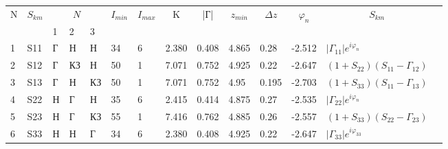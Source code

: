 
	\begin{tabular}{|l|l|l|l|l|l|l|l|l|l|l|l|l|l}
	\cline{1-13}
	\multicolumn{1}{|c|}{\multirow{2}{*}{N}} & 
	\multicolumn{1}{c|}{\multirow{2}{*}{$S_{km}$}} & 
	\multicolumn{3}{c|}{$N_{}$} &
	\multicolumn{1}{c|}{\multirow{2}{*}{$I_{min}$}} & 
	\multicolumn{1}{c|}{\multirow{2}{*}{$I_{max}$}} & 
	\multicolumn{1}{c|}{\multirow{2}{*}{K}} & 
	\multicolumn{1}{c|}{\multirow{2}{*}{|Г|}} & 
	\multicolumn{1}{c|}{\multirow{2}{*}{$z_{min}$}} & 
	\multicolumn{1}{c|}{\multirow{2}{*}{$\Delta z$}} & 
	\multicolumn{1}{c|}{\multirow{2}{*}{$\varphi_n$}} & 
	\multicolumn{1}{c|}{\multirow{2}{*}{$S_{km}$}} &  \\ \cline{3-5}
	\multicolumn{1}{|c|}{} & 
	\multicolumn{1}{c|}{}  & 1  & 2   & 3  & 
	\multicolumn{1}{c|}{}  & 
	\multicolumn{1}{c|}{}  & 
	\multicolumn{1}{c|}{}  & 
	\multicolumn{1}{c|}{}  & 
	\multicolumn{1}{c|}{}  & 
	\multicolumn{1}{c|}{}  & 
	\multicolumn{1}{c|}{}  & 
	\multicolumn{1}{c|}{}  &  \\ \cline{1-13}
	1     & S11   & Г     & Н     & Н     & 34    & 6     & 2.380 & 0.408 & 4.865 & 0.28  & -2.512& $|\Gamma_{11}|e^{i\varphi_n}$     &  \\ \cline{1-13}
	2     & S12   & Г     & КЗ    & Н     & 50    & 1     & 7.071 & 0.752 & 4.925 & 0.22  & -2.647& $(1+S_{22})(S_{11}-\Gamma_{12})$  &  \\ \cline{1-13}
	3     & S13   & Г     & Н     & КЗ    & 50    & 1     & 7.071 & 0.752 & 4.95  & 0.195 & -2.703& $(1+S_{33})(S_{11}-\Gamma_{13})$  &  \\ \cline{1-13}
	4     & S22   & Н     & Г     & Н     & 35    & 6     & 2.415 & 0.414 & 4.875 & 0.27  & -2.535& $|\Gamma_{22}|e^{i\varphi_n}$     &  \\ \cline{1-13}
	5     & S23   & Н     & Г     & КЗ    & 55    & 1     & 7.416 & 0.762 & 4.885 & 0.26  & -2.557 & $(1+S_{33})(S_{22}-\Gamma_{23})$  &  \\ \cline{1-13}
	6     & S33   & Н     & Н     & Г     & 34    & 6     & 2.380 & 0.408 & 4.925 & 0.22  & -2.647& $|\Gamma_{33}|e^{i\varphi_{33}}$  &  \\ \cline{1-13}
	\end{tabular}

